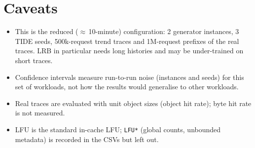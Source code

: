 \documentclass[10pt,a4paper]{article}
\begin{document}
\section*{Caveats}
\begin{itemize}
  \item This is the reduced ($\approx$\,10-minute) configuration: 2 generator instances, 3 TIDE seeds, 500k-request trend traces
        and 1M-request prefixes of the real traces. LRB in particular needs long histories and may be under-trained on short traces.
  \item Confidence intervals measure run-to-run noise (instances and seeds) for this set of workloads, not how the results would generalise to other workloads.
  \item Real traces are evaluated with unit object sizes (object hit rate); byte hit rate is not measured.
  \item LFU is the standard in-cache LFU; \texttt{LFU*} (global counts, unbounded metadata) is recorded in the CSVs but left out.
\end{itemize}

\clearpage
\begin{table}[H]
\centering\scriptsize

\caption{Synthetic results per trace and size (mean over instances; TIDE with a 95\% t-interval over instances $\times$ seeds).
Bold marks the best contender. Oracle is TIDE with true reuse distances; $\Delta$ARC is TIDE $-$ ARC.}
\end{table}
\end{document}
